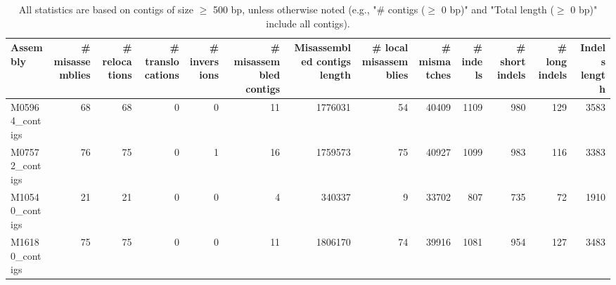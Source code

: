 \documentclass[12pt,a4paper]{article}
\begin{document}
\begin{table}[ht]
\begin{center}
\caption{All statistics are based on contigs of size $\geq$ 500 bp, unless otherwise noted (e.g., "\# contigs ($\geq$ 0 bp)" and "Total length ($\geq$ 0 bp)" include all contigs).}
\begin{tabular}{|l*{12}{|r}|}
\hline
Assembly & \# misassemblies &     \# relocations &     \# translocations &     \# inversions & \# misassembled contigs & Misassembled contigs length & \# local misassemblies & \# mismatches & \# indels &     \# short indels &     \# long indels & Indels length \\ \hline
M05964\_contigs & 68 & 68 & 0 & 0 & 11 & 1776031 & 54 & 40409 & 1109 & 980 & 129 & 3583 \\ \hline
M07572\_contigs & 76 & 75 & 0 & 1 & 16 & 1759573 & 75 & 40927 & 1099 & 983 & 116 & 3383 \\ \hline
M10540\_contigs & 21 & 21 & 0 & 0 & 4 & 340337 & 9 & 33702 & 807 & 735 & 72 & 1910 \\ \hline
M16180\_contigs & 75 & 75 & 0 & 0 & 11 & 1806170 & 74 & 39916 & 1081 & 954 & 127 & 3483 \\ \hline
\end{tabular}
\end{center}
\end{table}
\end{document}
